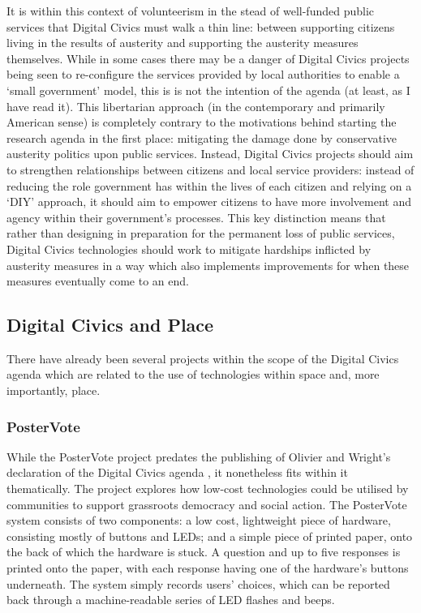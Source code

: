 It is within this context of volunteerism in the stead of well-funded public services that Digital Civics must walk a thin line: between supporting citizens living in the results of austerity and supporting the austerity measures themselves. While in some cases there may be a danger of Digital Civics projects being seen to re-configure the services provided by local authorities to enable a `small government' model, this is is not the intention of the agenda (at least, as I have read it). This libertarian approach (in the contemporary and primarily American sense) is completely contrary to the motivations behind starting the research agenda in the first place: mitigating the damage done by conservative austerity politics upon public services. Instead, Digital Civics projects should aim to strengthen relationships between citizens and local service providers: instead of reducing the role government has within the lives of each citizen and relying on a `DIY' approach, it should aim to empower citizens to have more involvement and agency within their government's processes. This key distinction means that rather than designing in preparation for the permanent loss of public services, Digital Civics technologies should work to mitigate hardships inflicted by austerity measures in a way which also implements improvements for when these measures eventually come to an end. 

\subsection{Digital Civics and Place}

There have already been several projects within the scope of the Digital Civics agenda which are related to the use of technologies within space and, more importantly, place.  

\subsubsection{PosterVote}
While the PosterVote project \citep{Vlachokyriakos2014} predates the publishing of Olivier and Wright's declaration of the Digital Civics agenda \citep{Olivier2015}, it nonetheless fits within it thematically. The project explores how low-cost technologies could be utilised by communities to support grassroots democracy and social action. The PosterVote system consists of two components: a low cost, lightweight piece of hardware, consisting mostly of buttons and LEDs; and a simple piece of printed paper, onto the back of which the hardware is stuck. A question and up to five responses is printed onto the paper, with each response having one of the hardware's buttons underneath. The system simply records users' choices, which can be reported back through a machine-readable series of LED flashes and beeps. 

